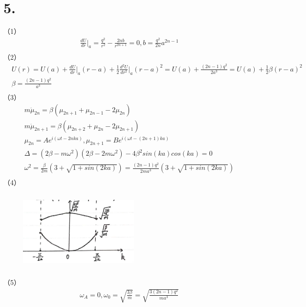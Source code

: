 \documentclass[UTF8]{ctexart}
\begin{document}
\section*{5.}
（1）
\begin{equation*}
    \begin{aligned}
       & \frac{dU}{dr}\bigg\lvert_a=\frac{q^2}{r^2}-\frac{2nb}{r^{2n+1}}=0, b=\frac{q^2}{2n}a^{2n-1}\\ 
    \end{aligned}
\end{equation*}
（2）
\begin{equation*}
    \begin{aligned}
        & U(r) = U(a)+\frac{dU}{dr}\bigg\lvert_a(r-a)+\frac{1}{2}\frac{d^2U}{dr^2}\bigg\lvert_a(r-a)^2 
        = U(a)+\frac{(2n-1)q^2}{2a^3}=U(a)+\frac{1}{2}\beta(r-a)^2\\
        & \beta = \frac{(2n-1)q^2}{a^3}\\
    \end{aligned}
\end{equation*}
（3）
\begin{equation*}
    \begin{aligned}
        & m\ddot\mu_{2n} = \beta(\mu_{2n+1}+\mu_{2n-1}-2\mu_{2n})\\
        & m\ddot\mu_{2n+1} = \beta(\mu_{2n+2}+\mu_{2n}-2\mu_{2n+1})\\
        & \mu_{2n} = Ae^{i(\omega t-2nka)}, \mu_{2n+1} = Be^{i(\omega t-(2n+1)ka)}\\
        & \Delta = (2\beta-m\omega^2)(2\beta-2m\omega^2)-4\beta^2sin(ka)cos(ka)=0\\
        & \omega^2 = \frac{\beta}{2m}(3+\sqrt{1+sin(2ka)})=\frac{(2n-1)q^2}{2ma^3}(3+\sqrt{1+sin(2ka)})\\
    \end{aligned}
\end{equation*}
（4）
\begin{figure}[H]                                        
    \centering                                                
    \includegraphics[width=6cm,height=4cm]{5-3.jpg}        
    \caption*{}                                                                                  
\end{figure}   
（5）
\begin{equation*}
    \begin{aligned}
        &\omega_A=0,\omega_0=\sqrt{\frac{3\beta}{m}}=\sqrt{\frac{3(2n-1)q^2}{ma^3}}\\
    \end{aligned}
\end{equation*}  
\end{document}
